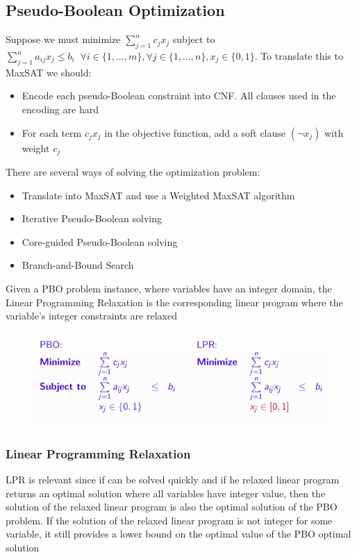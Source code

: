 \documentclass[10pt,a4paper]{report}
\begin{document}
\subsection{Pseudo-Boolean Optimization}
Suppose we must minimize $\sum_{j=1}^n c_jx_j$ subject to $\sum_{j=1}^n a_{ij}x_j \leq b_i \;\; \forall i \in \{1, ..., m\}, \forall j \in \{1, ..., n\}, x_j \in \{0, 1\}$. To translate this to MaxSAT we should:
\begin{itemize}
    \item Encode each pseudo-Boolean constraint into CNF. All clauses used in the encoding are hard
    \item For each term $c_jx_j$ in the objective function, add a soft clause $(\lnot x_j)$ with weight $c_j$
\end{itemize}
There are several ways of solving the optimization problem:
\begin{itemize}
    \item Translate into MaxSAT and use a Weighted MaxSAT algorithm
    \item Iterative Pseudo-Boolean solving
    \item Core-guided Pseudo-Boolean solving
    \item Branch-and-Bound Search
\end{itemize}
Given a PBO problem instance, where variables have an integer
domain, the Linear Programming Relaxation is the corresponding
linear program where the variable's integer constraints are relaxed
\begin{figure}[H]
    \centering
    \includegraphics[scale=0.5]{21.png}
\end{figure}
\subsubsection{Linear Programming Relaxation}
LPR is relevant since if can be solved quickly and if he relaxed linear program returns an optimal solution where all variables have integer value, then the solution of the relaxed linear program is also the optimal solution of the PBO problem. If the solution of the relaxed linear program is not integer for some variable, it still provides a lower bound on the optimal value of the PBO optimal solution
\end{document}
